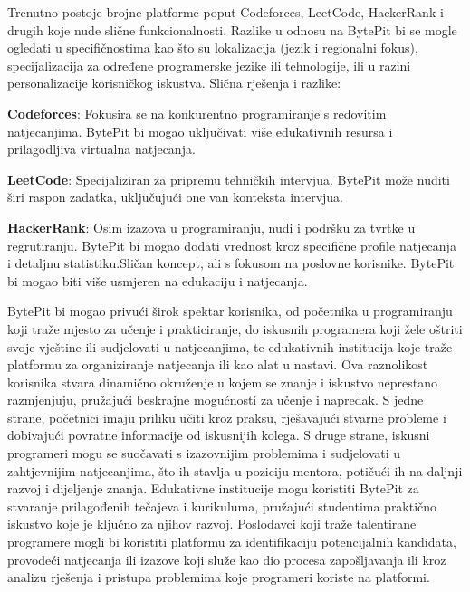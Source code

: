 		Trenutno postoje brojne platforme poput Codeforces, LeetCode,
		HackerRank i drugih koje nude slične funkcionalnosti. Razlike
		u odnosu na BytePit bi se mogle ogledati u specifičnostima kao
		što su lokalizacija (jezik i regionalni fokus), specijalizacija
		za određene programerske jezike ili tehnologije, ili u razini
		personalizacije korisničkog iskustva.
		Slična rješenja i razlike:
		\begin{packed_item}
			\item \textbf{Codeforces}: Fokusira se na konkurentno programiranje s
			redovitim natjecanjima. BytePit bi mogao uključivati više edukativnih
			resursa i prilagodljiva virtualna natjecanja.
			\item \textbf{LeetCode}: Specijaliziran za pripremu tehničkih intervjua.
			BytePit može nuditi širi raspon zadatka, uključujući one van konteksta intervjua.
			\item \textbf{HackerRank}: Osim izazova u programiranju, nudi i podršku
			za tvrtke u regrutiranju. BytePit bi mogao dodati vrednost kroz specifične
			profile natjecanja i detaljnu statistiku.Sličan koncept, ali s fokusom na
			poslovne korisnike. BytePit bi mogao biti više usmjeren na edukaciju i natjecanja.\\
		\end{packed_item}


		BytePit bi mogao privući širok spektar korisnika, od početnika u programiranju 
		koji traže mjesto za učenje i prakticiranje, do iskusnih programera koji žele 
		oštriti svoje vještine ili sudjelovati u natjecanjima, te edukativnih institucija 
		koje traže platformu za organiziranje natjecanja ili kao alat u nastavi. Ova 
		raznolikost korisnika stvara dinamično okruženje u kojem se znanje i iskustvo 
		neprestano razmjenjuju, pružajući beskrajne mogućnosti za učenje i napredak. 
		S jedne strane, početnici imaju priliku učiti kroz praksu, rješavajući stvarne 
		probleme i dobivajući povratne informacije od iskusnijih kolega. S druge strane, 
		iskusni programeri mogu se suočavati s izazovnijim problemima i sudjelovati u 
		zahtjevnijim natjecanjima, što ih stavlja u poziciju mentora, potičući ih na 
		daljnji razvoj i dijeljenje znanja. Edukativne institucije mogu koristiti BytePit 
		za stvaranje prilagođenih tečajeva i kurikuluma, pružajući studentima praktično 
		iskustvo koje je ključno za njihov razvoj. Poslodavci koji traže talentirane 
		programere mogli bi koristiti platformu za identifikaciju potencijalnih kandidata, 
		provodeći natjecanja ili izazove koji služe kao dio procesa zapošljavanja ili kroz 
		analizu rješenja i pristupa problemima koje programeri koriste na platformi.
		\\


